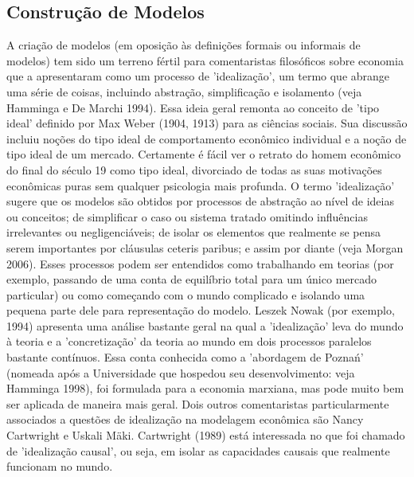 \documentclass[12pt]{article}
\begin{document}
\subsection{\textbf{Construção de Modelos}}
A criação de modelos (em oposição às definições formais ou informais de modelos) tem sido um terreno fértil para comentaristas filosóficos sobre economia que a apresentaram como um processo de 'idealização', um termo que abrange uma série de coisas, incluindo abstração, simplificação e isolamento (veja Hamminga e De Marchi 1994). Essa ideia geral remonta ao conceito de 'tipo ideal' definido por Max Weber (1904, 1913) para as ciências sociais. Sua discussão incluiu noções do tipo ideal de comportamento econômico individual e a noção de tipo ideal de um mercado. Certamente é fácil ver o retrato do homem econômico do final do século 19 como tipo ideal, divorciado de todas as suas motivações econômicas puras sem qualquer psicologia mais profunda. O termo 'idealização' sugere que os modelos são obtidos por processos de abstração ao nível de ideias ou conceitos; de simplificar o caso ou sistema tratado omitindo influências irrelevantes ou negligenciáveis; de isolar os elementos que realmente se pensa serem importantes por cláusulas ceteris paribus; e assim por diante (veja Morgan 2006). Esses processos podem ser entendidos como trabalhando em teorias (por exemplo, passando de uma conta de equilíbrio total para um único mercado particular) ou como começando com o mundo complicado e isolando uma pequena parte dele para representação do modelo. Leszek Nowak (por exemplo, 1994) apresenta uma análise bastante geral na qual a 'idealização' leva do mundo à teoria e a 'concretização' da teoria ao mundo em dois processos paralelos bastante contínuos. Essa conta conhecida como a 'abordagem de Poznań' (nomeada após a Universidade que hospedou seu desenvolvimento: veja Hamminga 1998), foi formulada para a economia marxiana, mas pode muito bem ser aplicada de maneira mais geral. Dois outros comentaristas particularmente associados a questões de idealização na modelagem econômica são Nancy Cartwright e Uskali Mäki. Cartwright (1989) está interessada no que foi chamado de 'idealização causal', ou seja, em isolar as capacidades causais que realmente funcionam no mundo.
\end{document}
